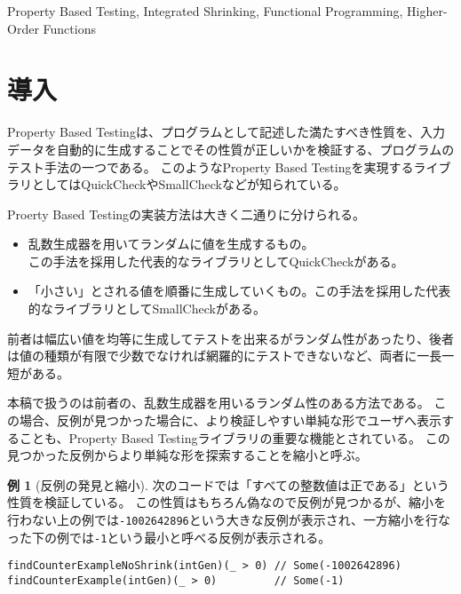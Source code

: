 \documentclass[submit,PRO,onecolumn]{ipsj}
\theoremstyle{definition}
\newtheorem{example}{例}
\begin{document}
\begin{ekeyword}
  Property Based Testing, Integrated Shrinking, Functional Programming, Higher-Order Functions
\end{ekeyword}

\maketitle

\section{導入}

Property Based Testingは、プログラムとして記述した満たすべき性質を、入力データを自動的に生成することでその性質が正しいかを検証する、プログラムのテスト手法の一つである。
このようなProperty Based Testingを実現するライブラリとしてはQuickCheck\cite{claessen_quickcheck_2011}やSmallCheck\cite{runciman_smallcheck_2008}などが知られている。

Proerty Based Testingの実装方法は大きく二通りに分けられる。

\begin{itemize}
  \item 乱数生成器を用いてランダムに値を生成するもの。\\この手法を採用した代表的なライブラリとしてQuickCheckがある。
  \item 「小さい」とされる値を順番に生成していくもの。この手法を採用した代表的なライブラリとしてSmallCheckがある。
\end{itemize}

前者は幅広い値を均等に生成してテストを出来るがランダム性があったり、後者は値の種類が有限で少数でなければ網羅的にテストできないなど、両者に一長一短がある。

本稿で扱うのは前者の、乱数生成器を用いるランダム性のある方法である。
この場合、反例が見つかった場合に、より検証しやすい単純な形でユーザへ表示することも、Property Based Testingライブラリの重要な機能とされている。
この見つかった反例からより単純な形を探索することを縮小と呼ぶ。

\begin{example}[反例の発見と縮小]
次のコードでは「すべての整数値は正である」という性質を検証している。
この性質はもちろん偽なので反例が見つかるが、縮小を行わない上の例では\texttt{-1002642896}という大きな反例が表示され、一方縮小を行なった下の例では\texttt{-1}という最小と呼べる反例が表示される。

\begin{verbatim}
findCounterExampleNoShrink(intGen)(_ > 0) // Some(-1002642896)
findCounterExample(intGen)(_ > 0)         // Some(-1)
\end{verbatim}
\end{example}
\end{document}
